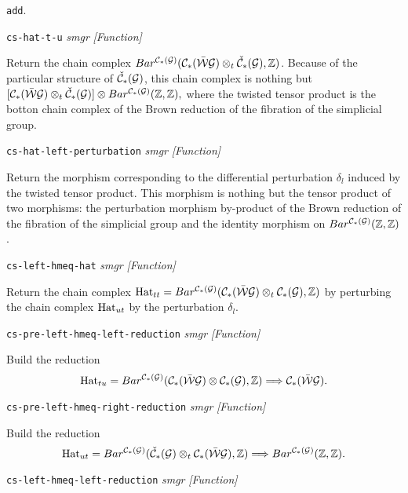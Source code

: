 {{{\tt add}. \par}
{\leftskip=5mm
{\tt cs-hat-t-u} {\em smgr}  \hfill {\em [Function]} \par}
{\leftskip=15mm
Return the chain complex
$Bar^{{\cal C}_*({\cal G})}({\cal C}_*(\bar{\cal W}{\cal G})\otimes_t {\check{\cal C}}_*({\cal G}),\mathbb{Z})$. Because of
the particular structure of ${\check{\cal C}}_*({\cal G})$, this chain complex is nothing but
$[{\cal C}_*(\bar{\cal W}{\cal G})\otimes_t {\check{\cal C}}_*({\cal G})]\otimes Bar^{{\cal C}_*({\cal G})}(\mathbb{Z},\mathbb{Z}),$
where the twisted tensor product is the botton chain complex of the Brown reduction
of the fibration of the simplicial group. \par}
{\leftskip=5mm
{\tt cs-hat-left-perturbation} {\em smgr}  \hfill {\em [Function]} \par}
{\leftskip=15mm
Return the morphism corresponding to the differential perturbation $\delta_l$ induced
by the twisted tensor product. This morphism is nothing but the tensor product of two
morphisms: the perturbation morphism by-product of the Brown reduction of the fibration of
the simplicial group and the identity morphism on $Bar^{{\cal C}_*({\cal G})}(\mathbb{Z},\mathbb{Z})$. \par}
{\leftskip=5mm
{\tt cs-left-hmeq-hat} {\em smgr}  \hfill {\em [Function]} \par}
{\leftskip=15mm
Return the chain complex
${\rm Hat}_{tt}=Bar^{{\cal C}_*({\cal G})}({\cal C}_*(\bar{\cal W}{\cal G})\otimes_t {\cal C}_*({\cal G}),\mathbb{Z})$ by
perturbing the chain complex ${\rm Hat}_{ut}$ by the perturbation $\delta_l$. \par}
{\leftskip=5mm
{\tt cs-pre-left-hmeq-left-reduction} {\em smgr}  \hfill {\em [Function]} \par}
{\leftskip=15mm
Build the reduction
$${\rm Hat}_{tu}=Bar^{{\cal C}_*({\cal G})}({\cal C}_*(\bar{\cal W}{\cal G})\otimes {\cal C}_*({\cal G}),\mathbb{Z}) \Longrightarrow {\cal C}_*(\bar{\cal W}{\cal G}).$$
\par}
{\leftskip=5mm
{\tt cs-pre-left-hmeq-right-reduction} {\em smgr}  \hfill {\em [Function]} \par}
{\leftskip=15mm
Build the reduction
$${\rm Hat}_{ut}=Bar^{{\cal C}_*({\cal G})}({\check{\cal C}}_*({\cal G})\otimes_t {\cal C}_*(\bar{\cal W}{\cal G}),\mathbb{Z}) \Longrightarrow
Bar^{{\cal C}_*({\cal G})}(\mathbb{Z}, \mathbb{Z}).$$ \par}
{\leftskip=5mm
{\tt cs-left-hmeq-left-reduction} {\em smgr}  \hfill {\em [Function]} \par}
}
